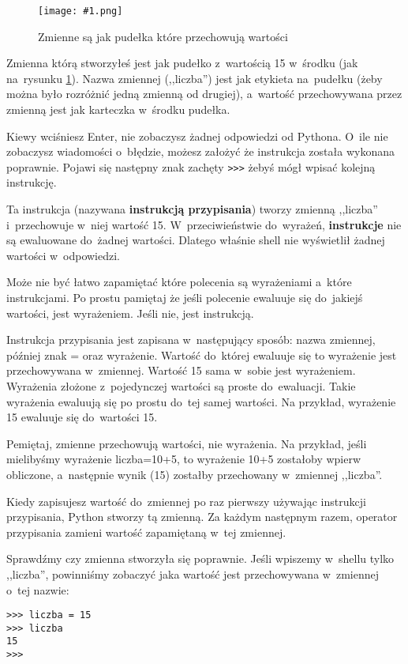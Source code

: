 \documentclass{book}
\newcommand{\img}[3]{
\begin{figure}
\centerline{
	\texttt{[image: \#1.png]}
}
\caption{#2}
\label{#1}
\end{figure}
}
\begin{document}
\img{idle-zmienna}{Zmienne są jak pudełka które przechowują wartości}{4 cm}

Zmienna którą stworzyłeś jest jak pudełko z~wartością 15 w~środku (jak na~rysunku \ref{idle-zmienna}). Nazwa zmiennej (,,liczba'') jest jak etykieta na~pudełku (żeby można było rozróżnić jedną zmienną od drugiej), a~wartość przechowywana przez zmienną jest jak karteczka w~środku pudełka.

Kiewy wciśniesz Enter, nie zobaczysz żadnej odpowiedzi od Pythona. O~ile nie zobaczysz wiadomości o~błędzie, możesz założyć że instrukcja została wykonana poprawnie. Pojawi się następny znak zachęty \lstinline{>>>} żebyś mógł wpisać kolejną instrukcję.

Ta instrukcja (nazywana {\bf instrukcją przypisania}) tworzy zmienną ,,liczba'' i~przechowuje w~niej wartość 15. W~przeciwieństwie do~wyrażeń, {\bf instrukcje} nie są ewaluowane do~żadnej wartości. Dlatego właśnie shell nie wyświetlił żadnej wartości w~odpowiedzi.

Może nie być łatwo zapamiętać które polecenia są wyrażeniami a~które instrukcjami. Po prostu pamiętaj że jeśli polecenie ewaluuje się do~jakiejś wartości, jest wyrażeniem. Jeśli nie, jest instrukcją.

Instrukcja przypisania jest zapisana w~następujący sposób: nazwa zmiennej, później znak = oraz wyrażenie. Wartość do~której ewaluuje się to wyrażenie jest przechowywana w~zmiennej. Wartość 15 sama w~sobie jest wyrażeniem. Wyrażenia złożone z~pojedynczej wartości są proste do~ewaluacji. Takie wyrażenia ewaluują się po prostu do~tej samej wartości. Na przykład, wyrażenie 15 ewaluuje się do~wartości 15.

Pemiętaj, zmienne przechowują wartości, nie wyrażenia. Na przykład, jeśli mielibyśmy wyrażenie liczba=10+5, to wyrażenie 10+5 zostałoby wpierw obliczone, a~następnie wynik (15) zostałby przechowany w~zmiennej ,,liczba''.

Kiedy zapisujesz wartość do~zmiennej po raz pierwszy używając instrukcji przypisania, Python stworzy tą zmienną. Za każdym następnym razem, operator przypisania zamieni wartość zapamiętaną w~tej zmiennej.

Sprawdźmy czy zmienna stworzyła się poprawnie. Jeśli wpiszemy w~shellu tylko ,,liczba'', powinniśmy zobaczyć jaka wartość jest przechowywana w~zmiennej o~tej nazwie:

\begin{lstlisting}
>>> liczba = 15
>>> liczba
15
>>> 
\end{lstlisting}
\end{document}
